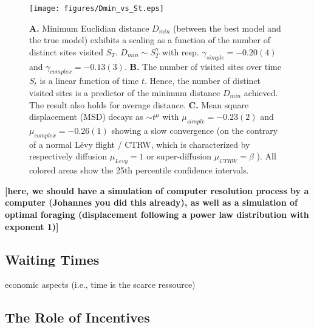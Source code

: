 \begin{figure}[h!]
\begin{center}
\texttt{[image: figures/Dmin\_vs\_St.eps]}
\caption{{\bf A.} Minimum Euclidian distance $D_{min}$ (between the best model and the true model) exhibits a scaling as a function of the number of distinct sites visited $S_{T}$. $D_{min} \sim S_{T}^{\gamma}$ with resp. $\gamma_{simple} = -0.20(4)$ and $\gamma_{complex} = - 0.13(3)$. {\bf B.}  The number of visited sites over time $S_t$ is a linear function of time $t$. Hence, the number of distinct visited sites is a predictor of the minimum distance $D_{min}$ achieved. The result also holds for average distance. {\bf C.}  Mean square displacement (MSD) decays as $\sim t^{\mu}$ with $\mu_{simple} =-0.23(2)$ and $\mu_{complex} =- 0.26(1)$ showing a slow convergence (on the contrary of a normal L\'evy flight / CTRW, which is characterized by respectively diffusion $\mu_{Levy} = 1$ or super-diffusion $\mu_{CTRW} = \beta$ \cite{21,23}). All colored areas show the 25th percentile confidence intervals.}
\label{fig:Dmin_vs_St}
\end{center}
\end{figure}


{\bf [here, we should have a simulation of computer resolution process by a computer (Johannes you did this already), as well as a simulation of optimal foraging (displacement following a power law distribution with exponent 1)]}


\subsection{Waiting Times}

economic aspects (i.e., time is the scarce ressource)

\subsection{The Role of Incentives}


